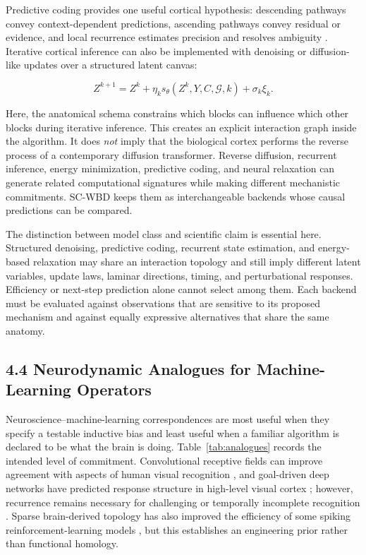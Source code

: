 Predictive coding provides one useful cortical hypothesis: descending pathways
convey context-dependent predictions, ascending pathways convey residual or
evidence, and local recurrence estimates precision and resolves ambiguity
\citep{bastos2012}. Iterative cortical inference can also be implemented with
denoising or diffusion-like updates over a structured latent canvas:

\[
Z^{k+1}=Z^k+\eta_k
s_\theta\!\left(Z^k,Y,C,\mathcal{G},k\right)+\sigma_k\xi_k .
\]

Here, the anatomical schema constrains which blocks can influence which other
blocks during iterative inference. This creates an explicit interaction graph
inside the algorithm. It does \emph{not} imply that the biological cortex
performs the reverse process of a contemporary diffusion transformer. Reverse
diffusion, recurrent inference, energy minimization, predictive coding, and
neural relaxation can generate related computational signatures while making
different mechanistic commitments. SC-WBD keeps them as interchangeable
backends whose causal predictions can be compared.

The distinction between model class and scientific claim is essential here.
Structured denoising, predictive coding, recurrent state estimation, and
energy-based relaxation may share an interaction topology and still imply
different latent variables, update laws, laminar directions, timing, and
perturbational responses. Efficiency or next-step prediction alone cannot
select among them. Each backend must be evaluated against observations that
are sensitive to its proposed mechanism and against equally expressive
alternatives that share the same anatomy.

\subsection{4.4 Neurodynamic Analogues for Machine-Learning Operators}

Neuroscience--machine-learning correspondences are most useful when they
specify a testable inductive bias and least useful when a familiar algorithm is
declared to be what the brain is doing. Table~\ref{tab:analogues} records
the intended level of commitment. Convolutional receptive fields can improve
agreement with aspects of human visual recognition \citep{vandyk2021}, and
goal-driven deep networks have predicted response structure in high-level
visual cortex \citep{yamins2014}; however, recurrence remains necessary for
challenging or temporally incomplete recognition
\citep{tang2018,kar2019}. Sparse brain-derived topology has also improved the
efficiency of some spiking reinforcement-learning models
\citep{wang2024snn}, but this establishes an engineering prior rather than
functional homology.

